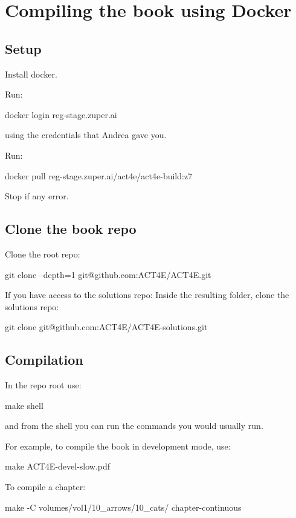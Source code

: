 
\section{Compiling the book using Docker}
\label{sec:compile-docker}

\subsection{Setup}

Install docker.

Run:
%
\begin{console}
    docker login reg-stage.zuper.ai
\end{console}
%
using the credentials that Andrea gave you.

Run:
%
\begin{console}
    docker pull reg-stage.zuper.ai/act4e/act4e-build:z7
\end{console}
%
Stop if any error.

\subsection{Clone the book repo}

Clone the root repo:
%
\begin{console}
    git clone --depth=1 git@github.com:ACT4E/ACT4E.git
\end{console}

If you have access to the solutions repo:
Inside the resulting folder, clone the solutions repo:
%
\begin{console}
    git clone git@github.com:ACT4E/ACT4E-solutions.git
\end{console}

\subsection{Compilation}

In the repo root use:
%
\begin{console}
    make shell
\end{console}

and from the shell you can run the commands you would usually run.

For example, to compile the book in development mode, use:
%
\begin{console}
    make ACT4E-devel-slow.pdf
\end{console}
%
To compile a chapter:
%
\begin{console}
    make -C volumes/vol1/10_arrows/10_cats/ chapter-continuous
\end{console}

